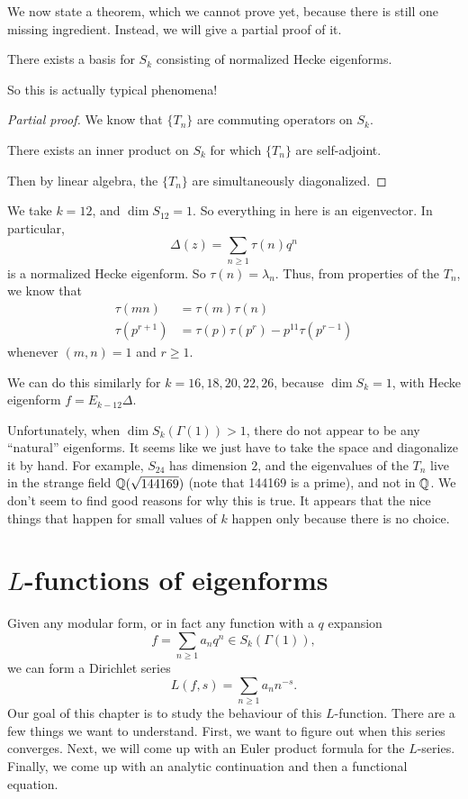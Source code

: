 \documentclass[a4paper]{article}
\begin{document}
We now state a theorem, which we cannot prove yet, because there is still one missing ingredient. Instead, we will give a partial proof of it.

\begin{thm}
  There exists a basis for $S_k$ consisting of normalized Hecke eigenforms.
\end{thm}
So this is actually typical phenomena!

\begin{proof}[Partial proof]
  We know that $\{T_n\}$ are commuting operators on $S_k$.
  \begin{fact}
    There exists an inner product on $S_k$ for which $\{T_n\}$ are self-adjoint.
  \end{fact}
  Then by linear algebra, the $\{T_n\}$ are simultaneously diagonalized.
\end{proof}

\begin{eg}
  We take $k = 12$, and $\dim S_{12} = 1$. So everything in here is an eigenvector. In particular,
  \[
    \Delta(z) = \sum_{n \geq 1} \tau(n) q^n
  \]
  is a normalized Hecke eigenform. So $\tau(n) = \lambda_n$. Thus, from properties of the $T_n$, we know that
  \begin{align*}
    \tau(mn) &= \tau(m) \tau(n)\\
    \tau(p^{r + 1}) &= \tau(p) \tau(p^r) - p^{11}\tau(p^{r - 1})
  \end{align*}
  whenever $(m, n) = 1$ and $r \geq 1$.
\end{eg}
We can do this similarly for $k = 16, 18, 20, 22, 26$, because $\dim S_k = 1$, with Hecke eigenform $f = E_{k - 12} \Delta$.

Unfortunately, when $\dim S_k(\Gamma(1)) > 1$, there do not appear to be any ``natural'' eigenforms. It seems like we just have to take the space and diagonalize it by hand. For example, $S_{24}$ has dimension $2$, and the eigenvalues of the $T_n$ live in the strange field $\mathbb{Q}(\sqrt{144169})$ (note that 144169 is a prime), and not in $\mathbb{Q}$. We don't seem to find good reasons for why this is true. It appears that the nice things that happen for small values of $k$ happen only because there is no choice.

\section{\texorpdfstring{$L$}{L}-functions of eigenforms}
Given any modular form, or in fact any function with a $q$ expansion
\[
  f = \sum_{n \geq 1} a_n q^n \in S_k(\Gamma(1)),
\]
we can form a Dirichlet series
\[
  L(f, s) = \sum_{n \geq 1} a_n n^{-s}.
\]
Our goal of this chapter is to study the behaviour of this $L$-function. There are a few things we want to understand. First, we want to figure out when this series converges. Next, we will come up with an Euler product formula for the $L$-series. Finally, we come up with an analytic continuation and then a functional equation.
\end{document}
